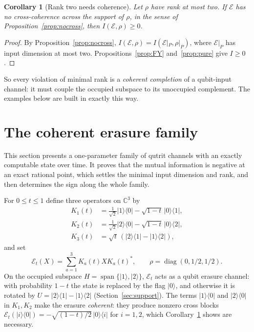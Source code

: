 \documentclass[11pt,a4paper]{article}
\newtheorem{corollary}[theorem]{Corollary}
\theoremstyle{definition}\newtheorem{definition}[theorem]{Definition}
\theoremstyle{remark}\newtheorem{remark}[theorem]{Remark}
\newcommand{\diag}{\operatorname{diag}}
\newcommand{\ket}[1]{\lvert #1\rangle}
\newcommand{\bra}[1]{\langle #1\rvert}
\newcommand{\E}{\mathcal E}
\begin{document}
\begin{corollary}[Rank two needs coherence]\label{cor:rank2}
Let $\rho$ have rank at most two. If $\E$ has no cross-coherence across the support of $\rho$, in the sense of Proposition~\ref{prop:nocross}, then $I(\E,\rho)\ge0$.
\end{corollary}
\begin{proof}
By Proposition~\ref{prop:nocross}, $I(\E,\rho)=I(\E|_P,\rho|_P)$, where $\E|_P$ has input dimension at most two. Propositions~\ref{prop:FY} and~\ref{prop:pure} give $I\ge0$.
\end{proof}
So every violation of minimal rank is a \emph{coherent completion} of a qubit-input channel: it must couple the occupied subspace to its unoccupied complement. The examples below are built in exactly this way.

\section{The coherent erasure family}\label{sec:family}
This section presents a one-parameter family of qutrit channels with an exactly computable state over time. It proves that the mutual information is negative at an exact rational point, which settles the minimal input dimension and rank, and then determines the sign along the whole family.

For $0\le t\le1$ define three operators on $\mathbb C^3$ by
\begin{align}
 K_1(t)&=\tfrac{1}{\sqrt2}\ket1\bra0-\sqrt{1-t}\,\ket0\bra1,\label{eq:k1}\\
 K_2(t)&=\tfrac{1}{\sqrt2}\ket2\bra0-\sqrt{1-t}\,\ket0\bra2,\\
 K_3(t)&=\sqrt t\,(\ket2\bra1-\ket1\bra2),
\end{align}
and set
\begin{equation}\label{eq:channel}
 \E_t(X)=\sum_{a=1}^3K_a(t)XK_a(t)^*,
 \qquad \rho=\diag(0,1/2,1/2).
\end{equation}
On the occupied subspace $H=\operatorname{span}\{\ket1,\ket2\}$, $\E_t$ acts as a qubit erasure channel: with probability $1-t$ the state is replaced by the flag $\ket0$, and otherwise it is rotated by $U=\ket2\bra1-\ket1\bra2$ (Section~\ref{sec:support}). The terms $\ket1\bra0$ and $\ket2\bra0$ in $K_1,K_2$ make the erasure \emph{coherent}: they produce nonzero cross blocks $\E_t(\ket i\bra0)=-\sqrt{(1-t)/2}\,\ket0\bra i$ for $i=1,2$, which Corollary~\ref{cor:rank2} shows are necessary.
\end{document}

